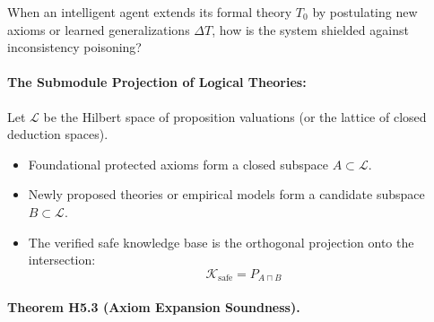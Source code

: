 \documentclass[
]{article}
\providecommand{\tightlist}{%
  \setlength{\itemsep}{0pt}\setlength{\parskip}{0pt}}
\begin{document}
When an intelligent agent extends its formal theory \(T_0\) by
postulating new axioms or learned generalizations \(\Delta T\), how is
the system shielded against inconsistency poisoning?

\paragraph{The Submodule Projection of Logical
Theories:}\label{the-submodule-projection-of-logical-theories}

Let \(\mathcal{L}\) be the Hilbert space of proposition valuations (or
the lattice of closed deduction spaces).

\begin{itemize}
\tightlist
\item
  Foundational protected axioms form a closed subspace
  \(A \subset \mathcal{L}\).
\item
  Newly proposed theories or empirical models form a candidate subspace
  \(B \subset \mathcal{L}\).
\item
  The verified safe knowledge base is the orthogonal projection onto the
  intersection: \[\mathcal{K}_{\mathrm{safe}} = P_{A \sqcap B}\]
\end{itemize}

\paragraph{Theorem H5.3 (Axiom Expansion
Soundness).}\label{theorem-h5.3-axiom-expansion-soundness.}
\end{document}
